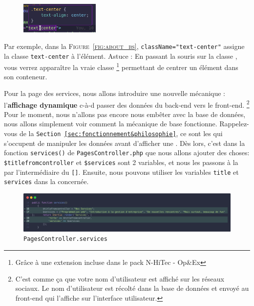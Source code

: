 \begin{figure}
    \vspace{-0.5cm}
    \includegraphics[width=0.35\textwidth]{figures-C1/tailwind_intellisense.png}
\end{figure}
Par exemple, dans la \textsc{Figure~\ref{fig:about_bs}}, \verb|className="text-center"| assigne la classe \verb|text-center| à l'élément. Astuce : En passant la souris sur la classe \tailwind{}, vous verrez apparaître la vraie classe \css{}\footnote{Grâce à une extension incluse dans le pack N-HiTec - Op\&Ex} permettant de centrer un élément dans son conteneur.



Pour la page des services, nous allons introduire une nouvelle mécanique : l'\textbf{affichage dynamique} c-à-d passer des données du back-end vers le front-end. \footnote{C'est comme ça que votre nom d'utilisateur est affiché sur les réseaux sociaux. Le nom d'utilisateur est récolté dans la base de données et envoyé au front-end qui l'affiche sur l'interface utilisateur.} Pour le moment, nous n'allons pas encore nous embêter avec la base de données, nous allons simplement voir comment la mécanique de base fonctionne. Rappelez-vous de la \texttt{Section~\ref{sec:fonctionnement&philosophie}}, ce sont les \controllers{} qui s'occupent de manipuler les données avant d'afficher une \view{}. Dès lors, c'est dans la fonction \verb|services()| de \verb|PagesController.php| que nous allons ajouter des choses: \verb|$titlefromcontroller| et \verb|$services| sont 2 variables, et nous les passons à la \view{} par l'intermédiaire du \verb|[]|. Ensuite, nous pouvons utiliser les variables \verb|title| et \verb|services| dans la \view{} concernée.

\begin{figure}[h]
    \centering
    \includegraphics[width=\textwidth]{figures-C1/services_update.png}
    \caption{\texttt{PagesController.services}}
\end{figure}

